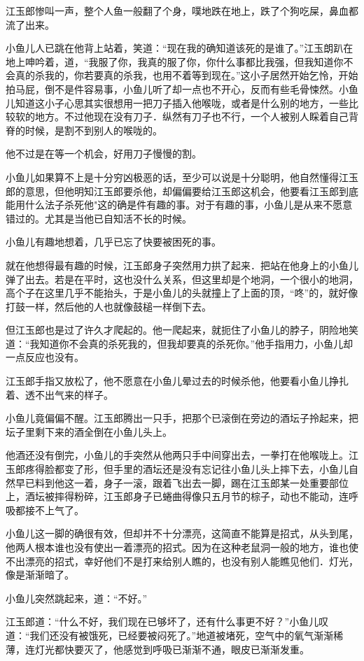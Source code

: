 \documentclass[12pt,oneside]{book}
\begin{document}
江玉郎惨叫一声，整个人鱼一般翻了个身，噗地跌在地上，跌了个狗吃屎，鼻血都流了出来。

小鱼儿人已跳在他背上站着，笑道：``现在我的确知道该死的是谁了。''江玉朗趴在地上呻吟着，道，``我服了你，我真的服了你，你什么事都比我强，但我知道你不会真的杀我的，你若要真的杀我，也用不着等到现在。''这小子居然开始乞怜，开始拍马屁，倒不是件容易事，小鱼儿听了却一点也不开心，反而有些毛骨悚然。小鱼儿知道这小子心思其实很想用一把刀子插入他喉咙，或者是什么别的地方，一些比较软的地方。不过他现在没有刀子．纵然有刀子也不行，一个人被别人睬着自己背脊的时候，是割不到别人的喉咙的。

他不过是在等一个机会，好用刀子慢慢的割。

小鱼儿如果算不上是十分穷凶极恶的话，至少可以说是十分聪明，他自然懂得江玉郎的意思，但他明知江玉郎要杀他，却偏偏要给江玉郎这机会，他要看江玉郎到底能用什么法子杀死他"这的确是件有趣的事。对于有趣的事，小鱼儿是从来不愿意错过的。尤其是当他已自知活不长的时候。

小鱼儿有趣地想着，几乎已忘了快要被困死的事。

就在他想得最有趣的时候，江玉郎身子突然用力拱了起来．把站在他身上的小鱼儿弹了出去。若是在平时，这也没什么关系，但这里却是个地洞，一个很小的地洞，高个子在这里几乎不能抬头，于是小鱼儿的头就撞上了上面的顶，``咚''的，就好像打鼓一样，然后他的人也就像鼓槌一样倒下去。

但江玉郎也是过了许久才爬起的。他一爬起来，就扼住了小鱼儿的脖子，阴险地笑道：``我知道你不会真的杀死我的，但我却要真的杀死你。''他手指用力，小鱼儿却一点反应也没有。

江玉郎手指又放松了，他不愿意在小鱼儿晕过去的时候杀他，他要看小鱼儿挣扎着、透不出气来的样子。

小鱼儿竟偏偏不醒。江玉郎腾出一只手，把那个已滚倒在旁边的酒坛子拎起来，把坛子里剩下来的酒全倒在小鱼儿头上。

他酒还没有倒完，小鱼儿的手突然从他两只手中间穿出去，一拳打在他喉咙上。江玉郎疼得脸都变了形，但手里的酒坛还是没有忘记往小鱼儿头上摔下去，小鱼儿自然早已料到他这一着，身子一滚，跟着飞出去一脚，踢在江玉郎某一处重要部位上，酒坛被摔得粉碎，江玉郎身子已蜷曲得像只五月节的棕子，动也不能动，连呼吸都接不上气了。

小鱼儿这一脚的确很有效，但却并不十分漂亮，这简直不能算是招式，从头到尾，他两人根本谁也没有使出一着漂亮的招式。因为在这种老鼠洞一般的地方，谁也使不出漂亮的招式，幸好他们不是打来给别人瞧的，也没有别人能瞧见他们．灯光，像是渐渐暗了。

小鱼儿突然跳起来，道：``不好。''

江玉郎道：``什么不好，我们现在已够坏了，还有什么事更不好？''小鱼儿叹道：``我们还没有被饿死，已经要被闷死了。''地道被堵死，空气中的氧气渐渐稀薄，连灯光都快要灭了，他感觉到呼吸已渐渐不通，眼皮已渐渐发重。
\end{document}
